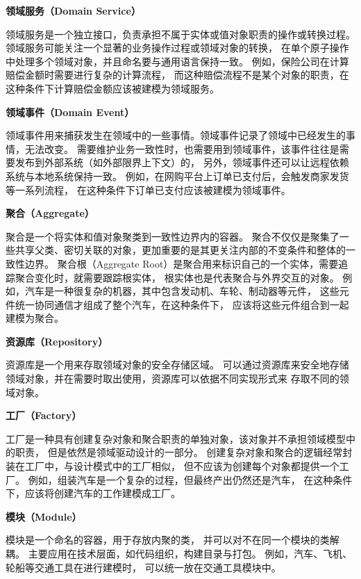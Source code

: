 \textbf{领域服务（Domain Service）}

领域服务是一个独立接口，负责承担不属于实体或值对象职责的操作或转换过程。
领域服务可能关注一个显著的业务操作过程或领域对象的转换，
在单个原子操作中处理多个领域对象，并且命名要与通用语言保持一致\cite{vernon2013implementing}。
例如，保险公司在计算赔偿金额时需要进行复杂的计算流程，
而这种赔偿流程不是某个对象的职责，在这种条件下计算赔偿金额应该被建模为领域服务。

\textbf{领域事件（Domain Event）}

领域事件用来捕获发生在领域中的一些事情。领域事件记录了领域中已经发生的事情，无法改变。
需要维护业务一致性时，也需要用到领域事件，该事件往往是需要发布到外部系统（如外部限界上下文）的，
另外，领域事件还可以让远程依赖系统与本地系统保持一致\cite{vernon2013implementing}。
例如，在网购平台上订单已支付后，会触发商家发货等一系列流程，
在这种条件下订单已支付应该被建模为领域事件。

\textbf{聚合（Aggregate）}

聚合是一个将实体和值对象聚类到一致性边界内的容器。
聚合不仅仅是聚集了一些共享父类、密切关联的对象，更加重要的是其更关注内部的不变条件和整体的一致性边界\cite{vernon2013implementing}。
聚合根（Aggregate Root）是聚合用来标识自己的一个实体，需要追踪聚合变化时，就需要跟踪根实体，
根实体也是代表聚合与外界交互的对象。
例如，汽车是一种很复杂的机器，其中包含发动机、车轮、制动器等元件，
这些元件统一协同通信才组成了整个汽车，在这种条件下，
应该将这些元件组合到一起建模为聚合。

\textbf{资源库（Repository）}

资源库是一个用来存取领域对象的安全存储区域\cite{vernon2013implementing}。
可以通过资源库来安全地存储领域对象，并在需要时取出使用，资源库可以依据不同实现形式来
存取不同的领域对象。

\textbf{工厂（Factory）}

工厂是一种具有创建复杂对象和聚合职责的单独对象，该对象并不承担领域模型中的职责，
但是依然是领域驱动设计的一部分\cite{vernon2013implementing}。
创建复杂对象和聚合的逻辑经常封装在工厂中，与设计模式中的工厂相似，
但不应该为创建每个对象都提供一个工厂。
例如，组装汽车是一个复杂的过程，但最终产出仍然还是汽车，
在这种条件下，应该将创建汽车的工作建模成工厂。


\textbf{模块（Module）}

模块是一个命名的容器，用于存放内聚的类，
并可以对不在同一个模块的类解耦\cite{vernon2013implementing}。
主要应用在技术层面，如代码组织，构建目录与打包。
例如，汽车、飞机、轮船等交通工具在进行建模时，
可以统一放在交通工具模块中。

